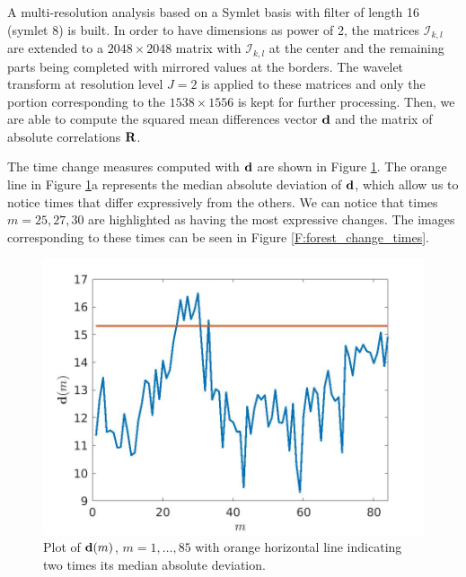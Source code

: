 \documentclass[journal]{IEEEtran}
\newcommand{\vd}{{\textbf d}}
\newcommand{\vR}{{\textbf R}}
\begin{document}
A multi-resolution analysis based on a Symlet basis with filter of length 16 (symlet 8) is built. In order to have dimensions as power of 2, the matrices $\mathcal{I}_{k,l}$ are extended to a $2048\times2048$ matrix with $\mathcal{I}_{k,l}$ at the center and the remaining parts being completed with mirrored values at the borders. The wavelet transform at resolution level $J=2$ is applied to these matrices and only the portion corresponding to the $1538 \times 1556$ is kept for further processing. Then, we are able to compute the squared mean differences vector $\vd$ and the matrix of absolute correlations $\vR$. 

The time change measures computed with $\vd$ are shown in Figure \ref{F:forest_wecs}. The orange line in Figure \ref{F:forest_wecs}a represents the median absolute deviation of $\vd$, which allow us to notice times that differ expressively from the others. We can notice that times $m=25,27,30$ are highlighted as having the most expressive changes. The images  corresponding to these times can be seen in Figure \ref{F:forest_change_times}.

\begin{figure}[htp!]
\centering
\includegraphics[scale=.2]{../../figs/forest_vSumDifCoefSq}\hspace{-.5cm}
\caption{Plot of $\vd(m)$, $m=1,\ldots,85$ with orange horizontal line indicating two times its median absolute deviation.}
\label{F:forest_wecs}
\end{figure}
\end{document}
